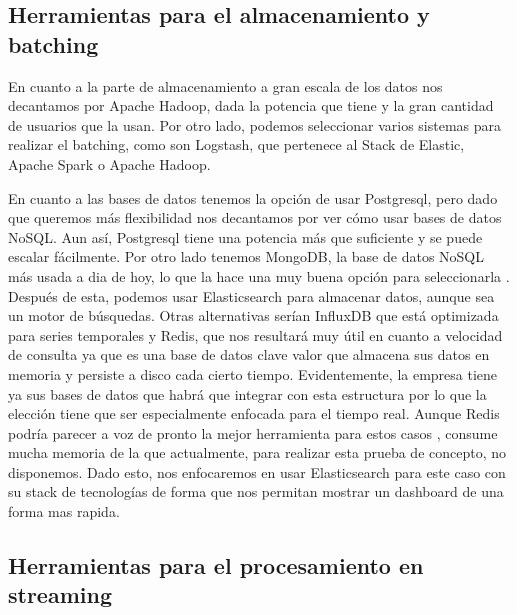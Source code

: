 \subsection{Herramientas para el almacenamiento y batching\label{hbach}}

En cuanto a la parte de almacenamiento a gran escala de los datos nos
decantamos por Apache Hadoop, dada la potencia que tiene y la gran cantidad
de usuarios que la usan. Por otro lado, podemos seleccionar varios sistemas
para realizar el batching, como son Logstash, que pertenece al Stack de
Elastic, Apache Spark o Apache Hadoop.

En cuanto a las bases de datos tenemos la opción de usar Postgresql, pero
dado que queremos más flexibilidad nos decantamos por ver cómo usar bases
de datos NoSQL. Aun así, Postgresql tiene una potencia más que suficiente y
se puede escalar fácilmente. Por otro lado tenemos MongoDB, la base de
datos NoSQL más usada a dia de hoy, lo que la hace una muy buena opción
para seleccionarla \cite{Hrr-5}. Después de esta, podemos usar
Elasticsearch para almacenar datos, aunque sea un motor de búsquedas. Otras
alternativas serían InfluxDB que está optimizada para series temporales y
Redis, que nos resultará muy útil en cuanto a velocidad de consulta ya que
es una base de datos clave valor que almacena sus datos en memoria y
persiste a disco cada cierto tiempo. Evidentemente, la empresa tiene ya sus
bases de datos que habrá que integrar con esta estructura por lo que la
elección tiene que ser especialmente enfocada para el tiempo real. Aunque
Redis podría parecer a voz de pronto la mejor herramienta para estos casos
\cite{Hrr-6}, consume mucha memoria de la que actualmente, para realizar
esta prueba de concepto, no disponemos. Dado esto, nos enfocaremos en usar
Elasticsearch para este caso con su stack de tecnologías de forma que nos
permitan mostrar un dashboard de una forma mas rapida.

\subsection{Herramientas para el procesamiento en streaming\label{hspeed}}

